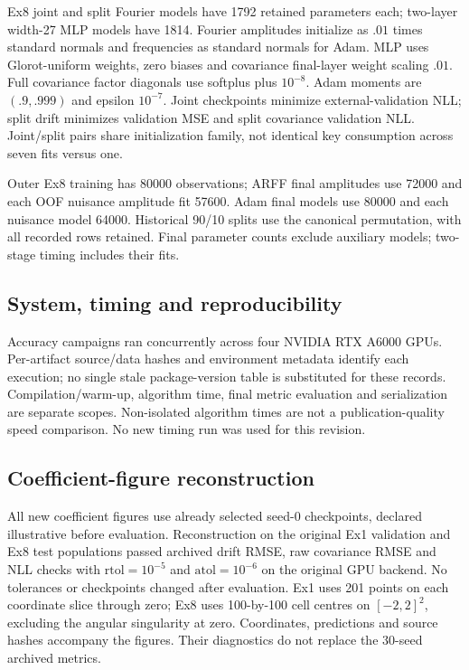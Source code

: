 Ex8 joint and split Fourier models have 1792 retained parameters each; two-layer width-27 MLP models have 1814. Fourier amplitudes initialize as $.01$ times standard normals and frequencies as standard normals for Adam. MLP uses Glorot-uniform weights, zero biases and covariance final-layer weight scaling $.01$. Full covariance factor diagonals use softplus plus $10^{-8}$. Adam moments are $(.9,.999)$ and epsilon $10^{-7}$. Joint checkpoints minimize external-validation NLL; split drift minimizes validation MSE and split covariance validation NLL. Joint/split pairs share initialization family, not identical key consumption across seven fits versus one.

Outer Ex8 training has 80000 observations; ARFF final amplitudes use 72000 and each OOF nuisance amplitude fit 57600. Adam final models use 80000 and each nuisance model 64000. Historical 90/10 splits use the canonical permutation, with all recorded rows retained. Final parameter counts exclude auxiliary models; two-stage timing includes their fits.

\subsection{System, timing and reproducibility}
Accuracy campaigns ran concurrently across four NVIDIA RTX A6000 GPUs. Per-artifact source/data hashes and environment metadata identify each execution; no single stale package-version table is substituted for these records. Compilation/warm-up, algorithm time, final metric evaluation and serialization are separate scopes. Non-isolated algorithm times are not a publication-quality speed comparison. No new timing run was used for this revision.

\subsection{Coefficient-figure reconstruction}
All new coefficient figures use already selected seed-0 checkpoints, declared illustrative before evaluation. Reconstruction on the original Ex1 validation and Ex8 test populations passed archived drift RMSE, raw covariance RMSE and NLL checks with $\mathrm{rtol}=10^{-5}$ and $\mathrm{atol}=10^{-6}$ on the original GPU backend. No tolerances or checkpoints changed after evaluation. Ex1 uses 201 points on each coordinate slice through zero; Ex8 uses 100-by-100 cell centres on $[-2,2]^2$, excluding the angular singularity at zero. Coordinates, predictions and source hashes accompany the figures. Their diagnostics do not replace the 30-seed archived metrics.

